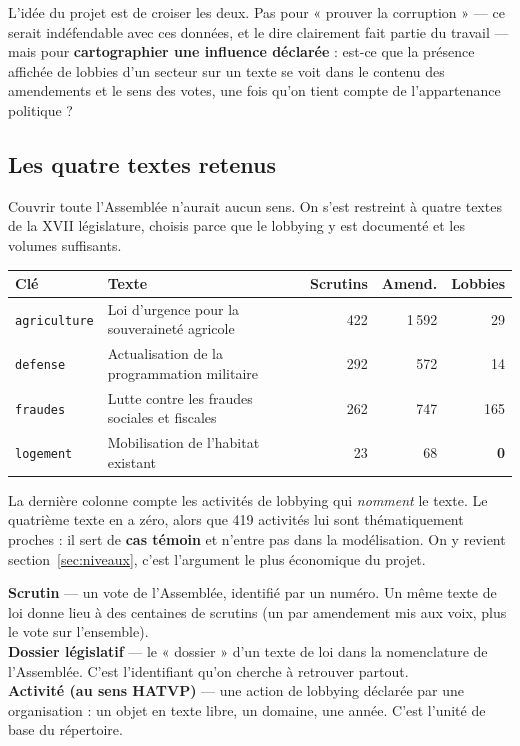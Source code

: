 \documentclass[11pt,a4paper]{article}
\begin{document}
L'idée du projet est de croiser les deux. Pas pour « prouver la corruption » --- ce serait
indéfendable avec ces données, et le dire clairement fait partie du travail --- mais pour
\textbf{cartographier une influence déclarée} : est-ce que la présence affichée de lobbies
d'un secteur sur un texte se voit dans le contenu des amendements et le sens des votes,
une fois qu'on tient compte de l'appartenance politique ?

\subsection{Les quatre textes retenus}

Couvrir toute l'Assemblée n'aurait aucun sens. On s'est restreint à quatre textes de la
XVII\ieme{} législature, choisis parce que le lobbying y est documenté et les volumes
suffisants.

\begin{center}
\small
\begin{tabular}{@{}llrrr@{}}
\toprule
\textbf{Clé} & \textbf{Texte} & \textbf{Scrutins} & \textbf{Amend.} & \textbf{Lobbies} \\
\midrule
\texttt{agriculture} & Loi d'urgence pour la souveraineté agricole & 422 & 1\,592 & 29 \\
\texttt{defense} & Actualisation de la programmation militaire & 292 & 572 & 14 \\
\texttt{fraudes} & Lutte contre les fraudes sociales et fiscales & 262 & 747 & 165 \\
\texttt{logement} & Mobilisation de l'habitat existant & 23 & 68 & \textbf{0} \\
\bottomrule
\end{tabular}
\end{center}

La dernière colonne compte les activités de lobbying qui \emph{nomment} le texte. Le
quatrième texte en a zéro, alors que 419 activités lui sont thématiquement proches : il
sert de \textbf{cas témoin} et n'entre pas dans la modélisation. On y revient
section~\ref{sec:niveaux}, c'est l'argument le plus économique du projet.

\begin{jargon}
\textbf{Scrutin} --- un vote de l'Assemblée, identifié par un numéro. Un même texte de loi
donne lieu à des centaines de scrutins (un par amendement mis aux voix, plus le vote sur
l'ensemble).\\[2pt]
\textbf{Dossier législatif} --- le « dossier » d'un texte de loi dans la nomenclature de
l'Assemblée. C'est l'identifiant qu'on cherche à retrouver partout.\\[2pt]
\textbf{Activité (au sens HATVP)} --- une action de lobbying déclarée par une organisation :
un objet en texte libre, un domaine, une année. C'est l'unité de base du répertoire.
\end{jargon}
\end{document}
